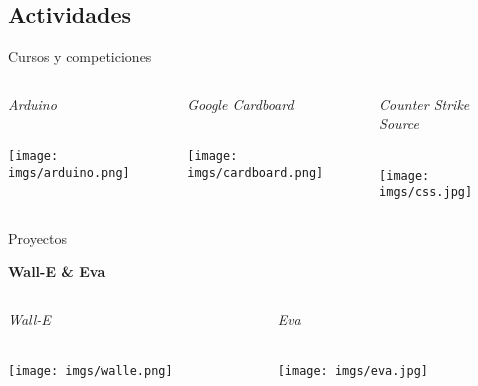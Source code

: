 \subsection{Actividades}
\begin{frame}{Cursos y competiciones}   
    \begin{columns}\begin{column}{0.33\textwidth}
        \centering\large\textit{Arduino} \\~
        
        \texttt{[image: imgs/arduino.png]}
    \end{column}\begin{column}{0.33\textwidth}
        \centering\large\textit{Google Cardboard} \\~
        
        \texttt{[image: imgs/cardboard.png]}
    \end{column}\begin{column}{0.33\textwidth}
        \centering\large\textit{Counter Strike Source} \\~
        
        \texttt{[image: imgs/css.jpg]}
    \end{column}\end{columns}
\end{frame}

\begin{frame}{Proyectos}
    \begin{center}
        \huge\textbf{Wall-E \& Eva}
    \end{center}
    
    \begin{columns}[t]\begin{column}{0.50\textwidth}
        \centering\large\textit{Wall-E}  \\~
        
        \texttt{[image: imgs/walle.png]}
    \end{column}\begin{column}{0.50\textwidth}
        \centering\large\textit{Eva}  \\~
        
        \texttt{[image: imgs/eva.jpg]}
    \end{column}\end{columns}
\end{frame}

